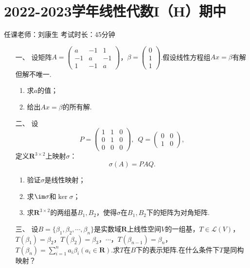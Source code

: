 \section*{2022-2023学年线性代数I（H）期中}

\begin{center}
    任课老师：刘康生\hspace{4em} 考试时长：45分钟
\end{center}
\begin{enumerate}
	\item[一、] 设矩阵$A=\begin{pmatrix}
        a & -1 & 1 \\ -1 & a & -1 \\ 1 & -1 & a
    \end{pmatrix}$，$\beta=\begin{pmatrix}
        0 \\ 1 \\ 1
    \end{pmatrix}$.假设线性方程组$Ax=\beta$有解但解不唯一.
    \begin{enumerate}[label=(\arabic*)]
        \item 求$a$的值；
        \item 给出$Ax=\beta$的所有解.
    \end{enumerate}
	\item[二、]设
	\[P=\begin{pmatrix}
        1 & 1 & 0 \\ 0 & 1 & 0 \\ 0 & 0 & 0
    \end{pmatrix},\enspace Q=\begin{pmatrix}
        0 & 0 \\ 1 & 0
    \end{pmatrix},\]
    定义$\mathbf{R}^{3\times 2}$上映射$\sigma$：
    \[\sigma(A)=PAQ.\]
    \begin{enumerate}[label=(\arabic*)]
        \item 验证$\sigma$是线性映射；
        \item 求$\im\sigma$和$\ker\sigma$；
        \item 求$\mathbf{R}^{3\times 2}$的两组基$B_1,B_2$，使得$\sigma$在$B_1,B_2$下的矩阵为对角矩阵.
    \end{enumerate}
	\item[三、]设$B=\{\beta_1,\beta_2,\cdots,\beta_n\}$是实数域$\mathbf{R}$上线性空间$V$的一组基，$T\in\mathcal{L}(V)$，$T(\beta_1)=\beta_2$，$T(\beta_2)=\beta_3$，$\cdots$，$T(\beta_{n-1})=\beta_n$，$T(\beta_n)=\sum\limits_{i=1}^{n}a_i\beta_i(a_i\in\mathbf{R})$.求$T$在$B$下的表示矩阵.在什么条件下$T$是同构映射？

\end{enumerate}
